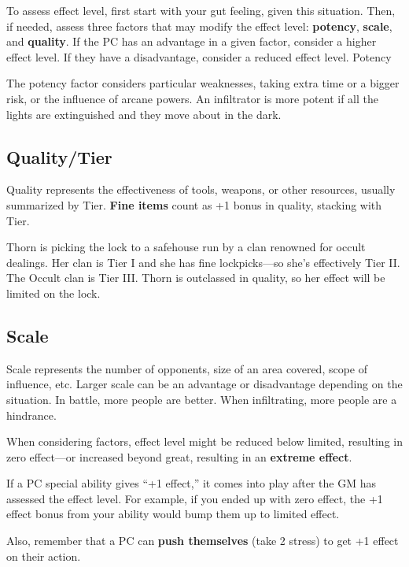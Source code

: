 To assess effect level, first start with your gut feeling, given this situation. Then, if needed, assess three factors that may modify the effect level: \textbf{potency}, \textbf{scale}, and \textbf{quality}. If the PC has an advantage in a given factor, consider a higher effect level. If they have a disadvantage, consider a reduced effect level.
Potency

The potency factor considers particular weaknesses, taking extra time or a bigger risk, or the influence of arcane powers. An infiltrator is more potent if all the lights are extinguished and they move about in the dark.

\subsection{Quality/Tier}

Quality represents the effectiveness of tools, weapons, or other resources, usually summarized by Tier. \textbf{Fine items} count as +1 bonus in quality, stacking with Tier.

\begin{qb}Thorn is picking the lock to a safehouse run by a clan renowned for occult dealings. Her clan is Tier I and she has fine lockpicks—so she’s effectively Tier II. The Occult clan is Tier III. Thorn is outclassed in quality, so her effect will be limited on the lock.\end{qb}

\subsection{Scale}

Scale represents the number of opponents, size of an area covered, scope of influence, etc. Larger scale can be an advantage or disadvantage depending on the situation. In battle, more people are better. When infiltrating, more people are a hindrance.

When considering factors, effect level might be reduced below limited, resulting in zero effect—or increased beyond great, resulting in an \textbf{extreme effect}.

If a PC special ability gives ``+1 effect,'' it comes into play after the GM has assessed the effect level. For example, if you ended up with zero effect, the +1 effect bonus from your  ability would bump them up to limited effect.

Also, remember that a PC can \textbf{push themselves} (take 2 stress) to get +1 effect on their action.


